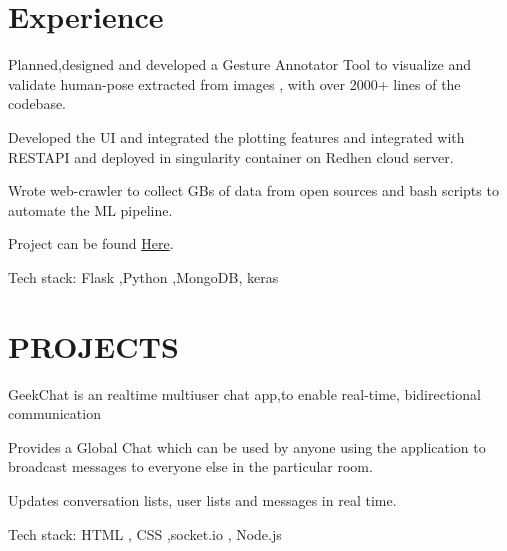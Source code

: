 \documentclass[]{deedy-resume-openfont}
\begin{document}
\hfill
\begin{minipage}[t]{0.66\textwidth} 


\section{Experience}

\vspace{\topsep} %
\begin{tightemize}\item Planned,designed and developed a Gesture Annotator Tool to visualize and
validate human-pose extracted from  images , with over 2000+ lines of the codebase.
\item Developed the UI and integrated the plotting features and integrated with RESTAPI and deployed in singularity container on Redhen cloud server.
\item Wrote web-crawler to collect GBs of data from open sources and bash scripts
to automate the ML pipeline.
\item Project can be found  \href{https://summerofcode.withgoogle.com/archive/2019/projects/5565179075493888/}{Here}.
\item Tech stack: Flask ,Python ,MongoDB, keras
\end{tightemize}
\sectionsep

\sectionsep


\section{PROJECTS}


GeekChat is an realtime multiuser chat app,to enable real-time, bidirectional communication
\begin{tightemize}
\item Provides a Global Chat which can be used by anyone using the application to
broadcast messages to everyone else in the particular room.
\item Updates conversation lists, user lists and messages in real time.
\item Tech stack: HTML , CSS ,socket.io , Node.js
\end{tightemize}
\sectionsep


\end{minipage}
\end{document}

